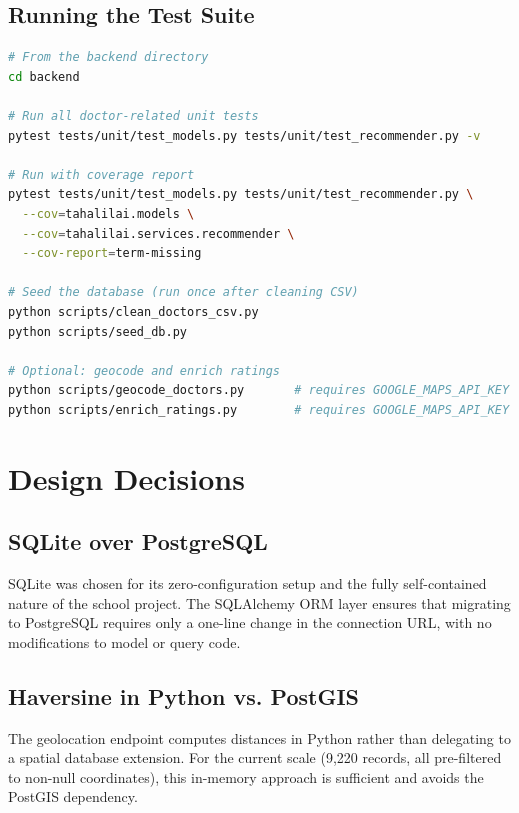 \documentclass[12pt, a4paper]{article}
\begin{document}
\subsection{Running the Test Suite}

\begin{lstlisting}[language=bash, style=pythonstyle,
  caption={Executing doctor feature unit tests}]
# From the backend directory
cd backend

# Run all doctor-related unit tests
pytest tests/unit/test_models.py tests/unit/test_recommender.py -v

# Run with coverage report
pytest tests/unit/test_models.py tests/unit/test_recommender.py \
  --cov=tahalilai.models \
  --cov=tahalilai.services.recommender \
  --cov-report=term-missing

# Seed the database (run once after cleaning CSV)
python scripts/clean_doctors_csv.py
python scripts/seed_db.py

# Optional: geocode and enrich ratings
python scripts/geocode_doctors.py       # requires GOOGLE_MAPS_API_KEY
python scripts/enrich_ratings.py        # requires GOOGLE_MAPS_API_KEY
\end{lstlisting}

\section{Design Decisions}

\subsection{SQLite over PostgreSQL}

SQLite was chosen for its zero-configuration setup and the fully
self-contained nature of the school project. The SQLAlchemy ORM layer
ensures that migrating to PostgreSQL requires only a one-line change
in the connection URL, with no modifications to model or query code.

\subsection{Haversine in Python vs. PostGIS}

The geolocation endpoint computes distances in Python rather than
delegating to a spatial database extension. For the current scale
(9,220 records, all pre-filtered to non-null coordinates), this
in-memory approach is sufficient and avoids the PostGIS dependency.
\end{document}
